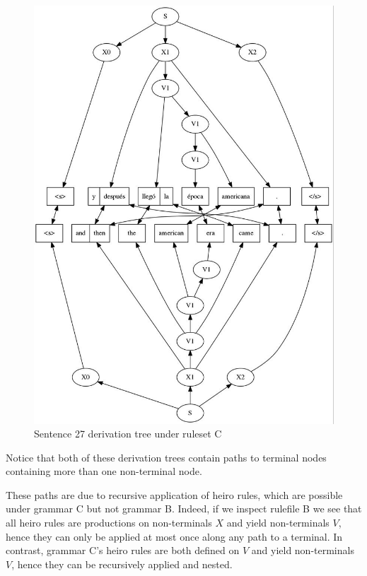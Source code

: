\documentclass[a4paper,oneside,reqno]{amsart}
\begin{document}
\begin{enumerate}[label=\arabic*.]
\begin{figure}[H]
\begin{center}
        \includegraphics[scale=0.5]{../output/tree27Cdvn1.jpg}
      \end{center}
      \caption{Sentence 27 derivation tree under ruleset C}
      \label{fig:27-c-tree}
    \end{figure}
    Notice that both of these derivation trees contain paths to terminal nodes
    containing more than one non-terminal node.

    These paths are due to recursive application of heiro rules, which are
    possible under grammar C but not grammar B. Indeed, if we inspect rulefile
    B we see that all heiro rules are productions on non-terminals $X$ and
    yield non-terminals $V$, hence they can only be applied at most once along
    any path to a terminal. In contrast, grammar C's heiro rules are both
    defined on $V$ and yield non-terminals $V$, hence they can be recursively
    applied and nested.
\end{enumerate}

%
%


\end{document}
